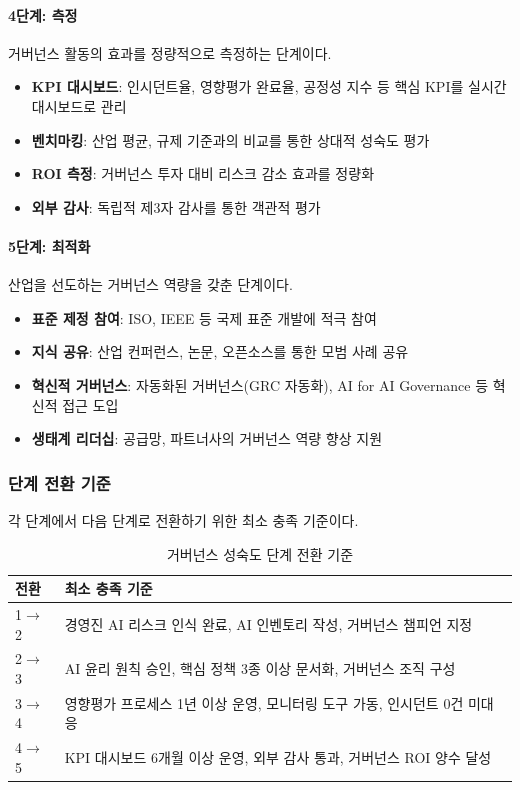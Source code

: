 \paragraph{4단계: 측정}
거버넌스 활동의 효과를 정량적으로 측정하는 단계이다.

\begin{itemize}
 \item \textbf{KPI 대시보드}: 인시던트율, 영향평가 완료율, 공정성 지수 등 핵심 KPI를 실시간 대시보드로 관리
 \item \textbf{벤치마킹}: 산업 평균, 규제 기준과의 비교를 통한 상대적 성숙도 평가
 \item \textbf{ROI 측정}: 거버넌스 투자 대비 리스크 감소 효과를 정량화
 \item \textbf{외부 감사}: 독립적 제3자 감사를 통한 객관적 평가
\end{itemize}

\paragraph{5단계: 최적화}
산업을 선도하는 거버넌스 역량을 갖춘 단계이다.

\begin{itemize}
 \item \textbf{표준 제정 참여}: ISO, IEEE 등 국제 표준 개발에 적극 참여
 \item \textbf{지식 공유}: 산업 컨퍼런스, 논문, 오픈소스를 통한 모범 사례 공유
 \item \textbf{혁신적 거버넌스}: 자동화된 거버넌스(GRC 자동화), AI for AI Governance 등 혁신적 접근 도입
 \item \textbf{생태계 리더십}: 공급망, 파트너사의 거버넌스 역량 향상 지원
\end{itemize}

\subsubsection{단계 전환 기준}

각 단계에서 다음 단계로 전환하기 위한 최소 충족 기준이다.

\begin{table}[htbp]
\centering
\caption{거버넌스 성숙도 단계 전환 기준}
\label{tab:20_transition}
\begin{tabularx}{\textwidth}{p{2.5cm}X}
\toprule
\textbf{전환} & \textbf{최소 충족 기준} \\
\midrule
1$\rightarrow$2 & 경영진 AI 리스크 인식 완료, AI 인벤토리 작성, 거버넌스 챔피언 지정 \\
2$\rightarrow$3 & AI 윤리 원칙 승인, 핵심 정책 3종 이상 문서화, 거버넌스 조직 구성 \\
3$\rightarrow$4 & 영향평가 프로세스 1년 이상 운영, 모니터링 도구 가동, 인시던트 0건 미대응 \\
4$\rightarrow$5 & KPI 대시보드 6개월 이상 운영, 외부 감사 통과, 거버넌스 ROI 양수 달성 \\
\bottomrule
\end{tabularx}
\end{table}

